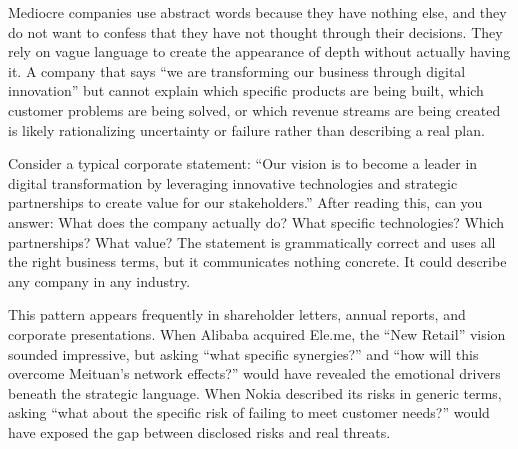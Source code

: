 Mediocre companies use abstract words because they have nothing else, and they do not want to confess that they have not thought through their decisions. They rely on vague language to create the appearance of depth without actually having it. A company that says ``we are transforming our business through digital innovation'' but cannot explain which specific products are being built, which customer problems are being solved, or which revenue streams are being created is likely rationalizing uncertainty or failure rather than describing a real plan.

Consider a typical corporate statement: ``Our vision is to become a leader in digital transformation by leveraging innovative technologies and strategic partnerships to create value for our stakeholders.'' After reading this, can you answer: What does the company actually do? What specific technologies? Which partnerships? What value? The statement is grammatically correct and uses all the right business terms, but it communicates nothing concrete. It could describe any company in any industry.

This pattern appears frequently in shareholder letters, annual reports, and corporate presentations. When Alibaba acquired Ele.me, the ``New Retail'' vision sounded impressive, but asking ``what specific synergies?'' and ``how will this overcome Meituan's network effects?'' would have revealed the emotional drivers beneath the strategic language. When Nokia described its risks in generic terms, asking ``what about the specific risk of failing to meet customer needs?'' would have exposed the gap between disclosed risks and real threats.
